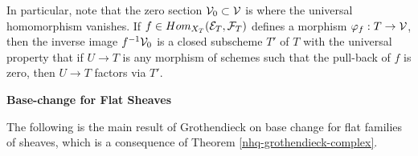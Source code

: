 




\begin{remark}\label{nhq-vanishing-scheme}
In particular, note that the zero section
$\mathcal{V}_0 \subset \mathcal{V}$ is where
the universal homomorphism vanishes.
If $f \in Hom_{X_T}(\mathcal{E}_T,\mathcal{F}_T)$ defines a morphism
$\varphi_f : T \to \mathcal{V}$, then the inverse image $f^{-1}\mathcal{V}_0$
is a closed subscheme $T'$ of $T$ with the universal property
that if $U\to T$ is any morphism of schemes such that
the pull-back of $f$ is zero, then $U\to T$ factors via $T'$.






\end{remark}

\bigskip





\centerline{\large\bf Base-change for Flat Sheaves}

\medskip


The following is the main result of Grothendieck on base change for flat
families of sheaves, which is a consequence of
Theorem \ref{nhq-grothendieck-complex}.


